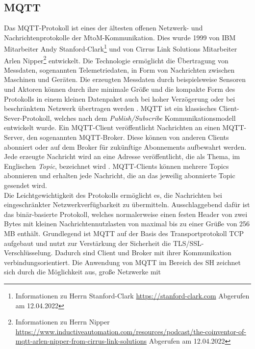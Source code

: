     \subsection{MQTT}
    \label{subsec:mqtt}
        Das \ac{MQTT}-Protokoll ist eines der ältesten offenen Netzwerk- und Nachrichtenprotokolle der 
        \ac{MtoM}-Kommunikation. 
        Dies wurde 1999 von IBM Mitarbeiter Andy Stanford-Clark\footnote{Informationen zu Herrn Stanford-Clark \url{https://stanford-clark.com} Abgerufen am 12.04.2022} 
        und von Cirrus Link Solutions Mitarbeiter Arlen Nipper\footnote{Informationen zu Herrn Nipper \url{https://www.inductiveautomation.com/resources/podcast/the-coinventor-of-mqtt-arlen-nipper-from-cirrus-link-solutions} Abgerufen am 12.04.2022} 
        entwickelt. Die Technologie ermöglicht die Übertragung von Messdaten, sogenannten Telemetriedaten, in Form von 
        Nachrichten zwischen Maschinen und Geräten. Die erzeugten Messdaten durch beispielsweise Sensoren und Aktoren 
        können durch ihre minimale Größe und die kompakte Form des Protokolls in einem kleinen Datenpaket auch bei 
        hoher Verzögerung oder bei beschränktem Netzwerk übertragen werden \cite{Naik2017}. \acs{MQTT} ist ein 
        klassisches Client-Sever-Protokoll, welches nach dem \textit{Publish/Subscribe} Kommunikationsmodell 
        entwickelt wurde. Ein \acs{MQTT}-Client veröffentlicht Nachrichten an einen \acs{MQTT}-Server, den sogenannten 
        \acs{MQTT}-Broker. Diese können von anderen Clients abonniert oder auf dem Broker für zukünftige Abonnements 
        aufbewahrt werden. Jede erzeugte Nachricht wird an eine Adresse veröffentlicht, die als Thema, im Englischen \textit{Topic}, 
        bezeichnet wird \cite{Naik2017}. \acs{MQTT}-Clients können mehrere Topics abonnieren und erhalten jede Nachricht, die an das 
        jeweilig abonnierte Topic gesendet wird. 
        \\
        Die Leichtgewichtigkeit des Protokolls ermöglicht es, die Nachrichten bei eingeschränkter Netzwerkverfügbarkeit zu 
        übermitteln. Ausschlaggebend dafür ist das binär-basierte Protokoll, welches normalerweise einen festen Header von 
        zwei Bytes mit kleinen Nachrichtennutzlasten von maximal bis zu einer Grüße von 256 MB \cite{Naik2017} enthält. Grundlegend 
        ist \acs{MQTT} auf der Basis des Transportprotokoll \ac{TCP} aufgebaut und nutzt zur Verstärkung der Sicherheit die 
        \ac{TLS}/\ac{SSL}-Verschlüsselung. Dadurch sind Client und Broker mit ihrer Kommunikation verbindungsorientiert.  
        Die Anwendung von \acs{MQTT} im Bereich des \acl{SH} zeichnet sich durch die Möglichkeit aus, große Netzwerke mit 
